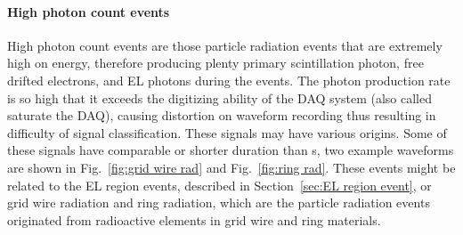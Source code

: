 \paragraph{High photon count events}
High photon count events are those particle radiation events that are extremely high on energy, therefore producing plenty primary scintillation photon, free drifted electrons, and EL photons during the events. The photon production rate is so high that it exceeds the digitizing ability of the DAQ system (also called saturate the DAQ), causing distortion on waveform recording thus resulting in difficulty of signal classification. These signals may have various origins. Some of these signals have comparable or shorter duration than \ees s, two example waveforms are shown in Fig.~\ref{fig:grid wire rad} and Fig.~\ref{fig:ring rad}. These events might be related to the EL region events, described in Section~\ref{sec:EL region event}, or grid wire radiation and ring radiation, which are the particle radiation events originated from radioactive elements in grid wire and ring materials. 


